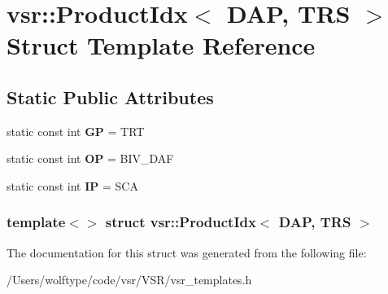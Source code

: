 \hypertarget{structvsr_1_1_product_idx_3_01_d_a_p_00_01_t_r_s_01_4}{\section{vsr\-:\-:Product\-Idx$<$ D\-A\-P, T\-R\-S $>$ Struct Template Reference}
\label{structvsr_1_1_product_idx_3_01_d_a_p_00_01_t_r_s_01_4}
}
\subsection*{Static Public Attributes}
\begin{DoxyCompactItemize}
\item 
\hypertarget{structvsr_1_1_product_idx_3_01_d_a_p_00_01_t_r_s_01_4_a68ef76a18be826383f345a3f08a93d45}{static const int {\bfseries G\-P} = T\-R\-T}\label{structvsr_1_1_product_idx_3_01_d_a_p_00_01_t_r_s_01_4_a68ef76a18be826383f345a3f08a93d45}

\item 
\hypertarget{structvsr_1_1_product_idx_3_01_d_a_p_00_01_t_r_s_01_4_aa01c89720eb375c2b86c254bdf0edf54}{static const int {\bfseries O\-P} = B\-I\-V\-\_\-\-D\-A\-F}\label{structvsr_1_1_product_idx_3_01_d_a_p_00_01_t_r_s_01_4_aa01c89720eb375c2b86c254bdf0edf54}

\item 
\hypertarget{structvsr_1_1_product_idx_3_01_d_a_p_00_01_t_r_s_01_4_abdae07e6bf19418aa79658335e198015}{static const int {\bfseries I\-P} = S\-C\-A}\label{structvsr_1_1_product_idx_3_01_d_a_p_00_01_t_r_s_01_4_abdae07e6bf19418aa79658335e198015}

\end{DoxyCompactItemize}
\subsubsection*{template$<$$>$ struct vsr\-::\-Product\-Idx$<$ D\-A\-P, T\-R\-S $>$}



The documentation for this struct was generated from the following file\-:\begin{DoxyCompactItemize}
\item 
/\-Users/wolftype/code/vsr/\-V\-S\-R/vsr\-\_\-templates.\-h\end{DoxyCompactItemize}
